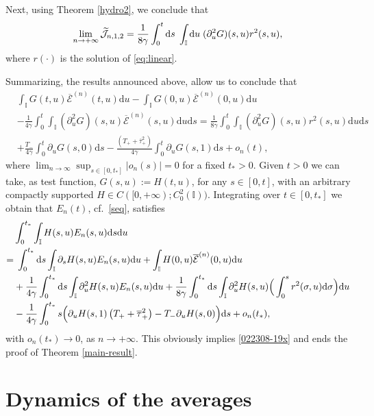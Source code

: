 \documentclass[EJP]{ejpecp} %
\newcommand\T{{\mathbb I}}
\newcommand \ga{\gamma}
\newcommand{\dd  }{\mathrm{d}}
\renewcommand{\tilde}{\widetilde}
\renewcommand{\bar}{\overline}
\numberwithin{equation}{section}
\begin{document}
Next,  using Theorem \ref{hydro2},
we conclude that
\begin{equation}
\label{010401-20}
\lim_{n\to+\infty}\tilde {\cal J}_{n,1,2}=\frac{1}{8\ga}\int_0^{t} \dd s\; \int_{\T} \dd u\;              (\partial^2_u  G)(s,u)r^2(s,u),
\end{equation}
where $r(\cdot)$ is the solution of \eqref{eq:linear}.



Summarizing,  the results announced above, allow us to conclude that 
\begin{align*}
 &\int_{\T} G (t,u) \bar{\mathcal E}^{(n)}(t,u)  \dd u - \int_{\T} G (0,u)
   \bar{\mathcal E}^{(n)} (0,u)  \dd u \\
&
-\frac{1}{4\ga}\int_0^{t}  \int_{\T} (\partial^2_u G)(s,u) \bar{\mathcal E}^{(n)} (s,u)   \dd u \dd s =\frac{1}{8\ga}\int_0^{t} \int_{\T}(\partial^2_u  G)(s,u)r^2(s,u) \dd u \dd s \\
&
+\frac{T_-}{4\ga} \int_0^t \partial_u G(s,0)  \dd s - \frac{\left(T_+
     + \bar\tau_+^2\right)}{4\ga} \int_0^t \partial_u G(s,1) \dd s +o_n(t),
\end{align*}
where $\lim_{n\to\infty}\sup_{s\in[0,t_*]}|o_n(s)|=0$  for a  fixed $t_*>0$. 
Given $t>0$ we can take, as  test function, $G(s,u):=H(t,u)$, for any $s\in[0,t]$, with an arbitrary compactly supported $H\in  C([0,+\infty);C_{0}^2(\T))$. Integrating over $t\in[0,t_*]$ we obtain that $E_n(t)$, cf.~\eqref{seq}, 
satisfies 
\begin{align*}
 &  \int_0^{t_*}  \int_{\T}H(s,u)E_n(s,u) \dd s \dd u \\   = & \; \int_0^{t_*}\dd s\int_{\T}\partial_s H(s,u)E_n(s,u )\dd u +\int_{\T} H(0,u)\bar{\mathcal E}^{(n)}(0,u)\dd u \\
&
+
\frac1{4\ga} \int_0^{t_*} \dd s  \int_{\T} 
    \partial_u^2H(s, u) E_n(s, u)\dd u+ \frac {1}{8\ga}\int_0^{t_*} \dd s \int_{\T} \partial_u^2 H(s,u)
\Big( \int_0^s  r^2(\sigma,u)\dd \sigma\Big) \dd u \notag \\
   & - \frac{1}{4\ga} \int_0^{t_*}s\Big(\partial_uH(s,1) \left( T_+
       + \bar\tau_+^2\right)
     -T_-\partial_uH(s,0) \Big) \dd s+o_n(t_*),
  \end{align*}
  with $o_n(t_*)\to0$, as $n\to+\infty$.
This obviously implies
\eqref{022308-19x} and ends the proof of  Theorem \ref{main-result}.



\section{Dynamics of the averages}
\end{document}
